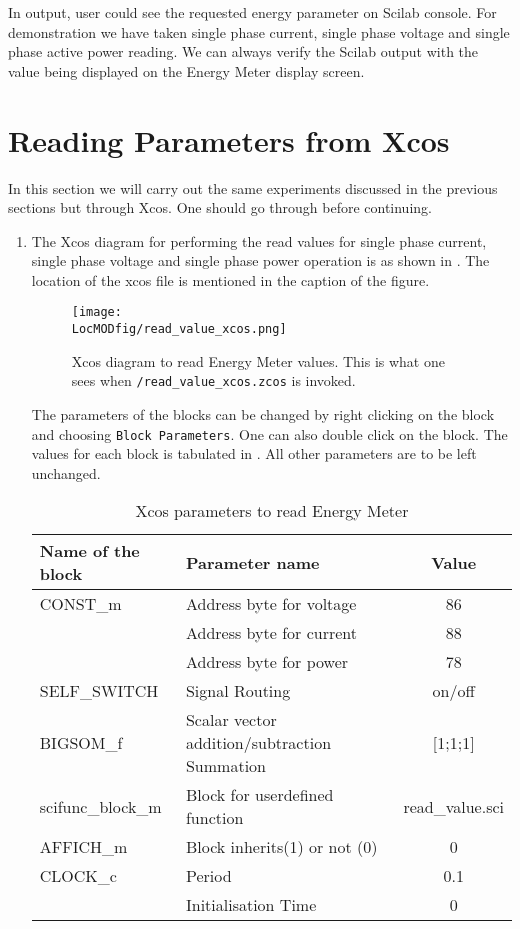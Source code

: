 In output, user could see the requested energy parameter on Scilab console. For demonstration we have taken single phase current, single phase voltage and single phase active power reading. We can always verify the Scilab output with the value being displayed on the Energy Meter display screen. 

\section{Reading Parameters from Xcos}
In this section we will carry out the same experiments discussed in the previous sections but through Xcos. One should go through  before continuing.

\begin{enumerate}
\item The Xcos diagram for performing the read values for single phase current, single phase voltage and single phase power operation is as shown in . The location of the xcos file is mentioned in the caption of the figure.

\begin{figure}
    \centering
    \texttt{[image: \\LocMODfig/read\_value\_xcos.png]}
    \caption[Xcos diagram to read Energy Meter values]{Xcos diagram to read Energy Meter values.  
      This is what one sees when 
      {\tt \LocMODscibrief/read\_value\_xcos.zcos} is invoked.}
    \label{fig:mod-read}
  \end{figure}
The parameters of the blocks can be changed by right clicking on the block and choosing {\tt Block Parameters}. One can also double click on the block. The values for each block is tabulated in .  All other parameters are to be left unchanged.

\begin{table}
    \centering
    \caption{Xcos parameters to read Energy Meter}
    \label{tab:mod-xcos-read}
    \begin{tabular}{llc} \hline
      Name of the block & Parameter name & Value \\ \hline
      CONST\_m & Address byte for voltage & 86  \\
      & Address byte for current & 88 \\ 
      & Address byte for power & 78\\ \hline
      SELF\_SWITCH & Signal Routing & on/off \\ \hline
      BIGSOM\_f & Scalar vector addition/subtraction Summation & [1;1;1] \\ \hline
      scifunc\_block\_m & Block for user\-defined function & read\_value.sci \\ \hline 
      AFFICH\_m & Block inherits(1) or not (0) & 0 \\ \hline
      CLOCK\_c & Period & 0.1 \\
      & Initialisation Time & 0 \\ \hline
    \end{tabular}
  \end{table}

\end{enumerate}

